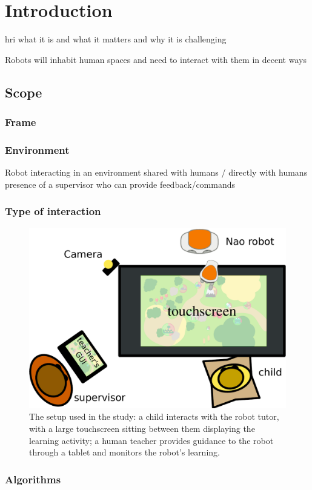 \chapter{Introduction} \label{chap:intro}
\graphicspath{{images/intro/}}

\gls{hri} what it is and what it matters and why it is challenging

Robots will inhabit human spaces and need to interact with them in decent ways

\section{Scope}\label{sec:intro-scope}

\subsection{Frame}

\subsection{Environment} \label{sec:scope-social}
Robot interacting in an environment shared with humans / directly with humans
presence of a supervisor who can provide feedback/commands

\subsection{Type of interaction}

\begin{figure}[ht]
	\includegraphics[width=.4\linewidth]{setup.pdf}
	\centering
	\caption{The setup used in the study: a child interacts with the robot tutor, with a large touchscreen sitting between them displaying the learning activity; a human teacher provides guidance to the robot through a tablet and monitors the robot's learning.}
	\label{fig:setup}
\end{figure}

\subsection{Algorithms}

